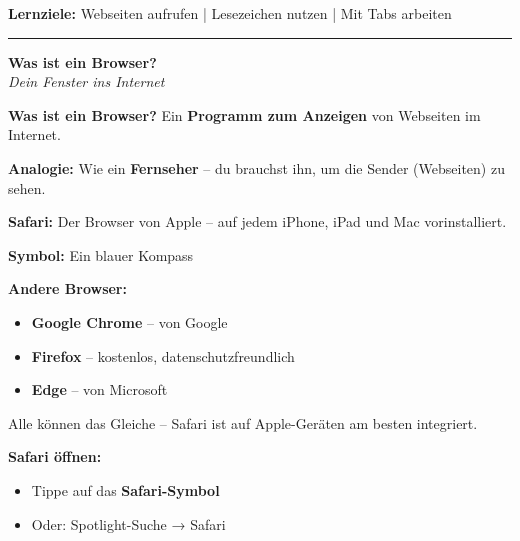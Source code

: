 \documentclass[a4paper,landscape,8pt]{extarticle}
\begin{document}

 \hfill
{\footnotesize\textbf{Lernziele:} Webseiten aufrufen | Lesezeichen nutzen | Mit Tabs arbeiten}

\vspace{1mm}
\hrule
\vspace{1mm}

\begin{minipage}[t]{0.32\linewidth}
\begin{center}
\colorbox{safariblue!10}{%
\begin{minipage}{0.95\linewidth}
\vspace{2mm}
\begin{center}
{\Large\bfseries\textcolor{safariblue}{Was ist ein Browser?}}\\[1pt]
{\footnotesize\itshape Dein Fenster ins Internet}
\end{center}
\vspace{2mm}
\end{minipage}%
}
\end{center}

\vspace{1mm}

\textbf{Was ist ein Browser?} Ein \textbf{Programm zum Anzeigen} von Webseiten im Internet.

\textbf{Analogie:} Wie ein \textbf{Fernseher} -- du brauchst ihn, um die Sender (Webseiten) zu sehen.

\textbf{Safari:} Der Browser von Apple -- auf jedem iPhone, iPad und Mac vorinstalliert.

\textbf{Symbol:} Ein blauer Kompass

\vspace{2mm}

\textbf{Andere Browser:}
\begin{itemize}
\item \textbf{Google Chrome} -- von Google
\item \textbf{Firefox} -- kostenlos, datenschutzfreundlich
\item \textbf{Edge} -- von Microsoft
\end{itemize}

Alle können das Gleiche -- Safari ist auf Apple-Geräten am besten integriert.

\vspace{2mm}

\textbf{Safari öffnen:}
\begin{itemize}
\item Tippe auf das \textbf{Safari-Symbol}
\item Oder: Spotlight-Suche → \glqq Safari\grqq{}
\end{itemize}

\end{minipage}%
\end{document}
